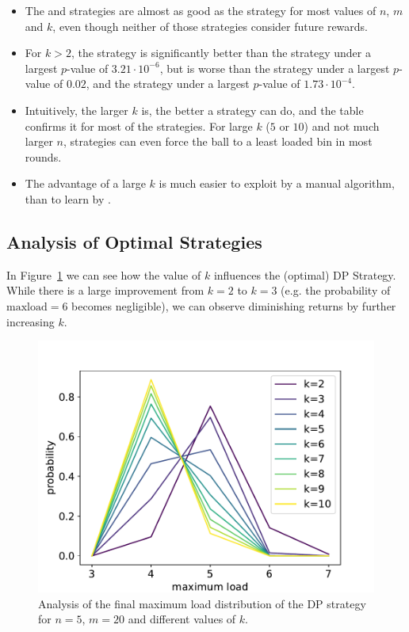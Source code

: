 \begin{itemize}
    \item
    The \Quantile and \LocalRewardOptimiser strategies are almost as good as the \DP strategy for most values of $n$, $m$ and $k$, even though neither of those strategies consider future rewards.
    \item
    For $k>2$, the \DQN strategy is significantly better than the \Threshold strategy under a largest $p$-value of $3.21\cdot 10^{-6}$, but is worse than the \Quantile strategy under a largest $p$-value of $0.02$, and the \LocalRewardOptimiser strategy under a largest $p$-value of $1.73\cdot 10^{-4}$.
    \item
    Intuitively, the larger $k$ is, the better a strategy can do, and the table confirms it for most of the strategies. For large $k$ ($5$ or $10$) and not much larger $n$, strategies can even force the ball to a least loaded bin in most rounds.
    \item
    The advantage of a large $k$ is much easier to exploit by a manual algorithm, than to learn by \DQL.
\end{itemize}


\subsection{Analysis of Optimal Strategies}


In Figure~\ref{k-thinning-dp-maxload} we can see how the value of $k$ influences the (optimal) DP Strategy. While there is a large improvement from $k=2$ to $k=3$ (e.g. the probability of $\mathrm{maxload}=6$ becomes negligible), we can observe diminishing returns by further increasing $k$.


\begin{figure}[h]
    \centering
    \includegraphics[scale=0.6]{Chapter4/Figs/k_thinning_max_load_distribution_5_20.pdf}
    \caption{Analysis of the final maximum load distribution of the DP strategy for $n=5$, $m=20$ and different values of $k$.}
    \label{k-thinning-dp-maxload}
\end{figure}


